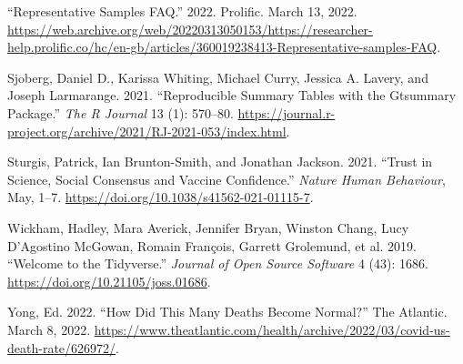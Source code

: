 \documentclass[
  letterpaper,
  DIV=11,
  numbers=noendperiod]{scrartcl}
\newlength{\cslhangindent}
\newlength{\cslentryspacingunit} %
\newenvironment{CSLReferences}[2] %
 {%
  \setlength{\parindent}{0pt}
  \ifodd #1
  \let\oldpar\par
  \def\par{\hangindent=\cslhangindent\oldpar}
  \fi
  \setlength{\parskip}{#2\cslentryspacingunit}
 }%
 {}
\begin{document}
\begin{CSLReferences}{1}{0}
\leavevmode{}%
{``Representative Samples FAQ.''} 2022. Prolific. March 13, 2022.
\url{https://web.archive.org/web/20220313050153/https://researcher-help.prolific.co/hc/en-gb/articles/360019238413-Representative-samples-FAQ}.

\leavevmode{}%
Sjoberg, Daniel D., Karissa Whiting, Michael Curry, Jessica A. Lavery,
and Joseph Larmarange. 2021. {``Reproducible Summary Tables with the
Gtsummary Package.''} \emph{The R Journal} 13 (1): 570--80.
\url{https://journal.r-project.org/archive/2021/RJ-2021-053/index.html}.

\leavevmode{}%
Sturgis, Patrick, Ian Brunton-Smith, and Jonathan Jackson. 2021.
{``Trust in Science, Social Consensus and Vaccine Confidence.''}
\emph{Nature Human Behaviour}, May, 1--7.
\url{https://doi.org/10.1038/s41562-021-01115-7}.

\leavevmode{}%
Wickham, Hadley, Mara Averick, Jennifer Bryan, Winston Chang, Lucy
D'Agostino McGowan, Romain François, Garrett Grolemund, et al. 2019.
{``Welcome to the Tidyverse.''} \emph{Journal of Open Source Software} 4
(43): 1686. \url{https://doi.org/10.21105/joss.01686}.

\leavevmode{}%
Yong, Ed. 2022. {``How Did This Many Deaths Become Normal?''} The
Atlantic. March 8, 2022.
\url{https://www.theatlantic.com/health/archive/2022/03/covid-us-death-rate/626972/}.

\end{CSLReferences}
\end{document}
